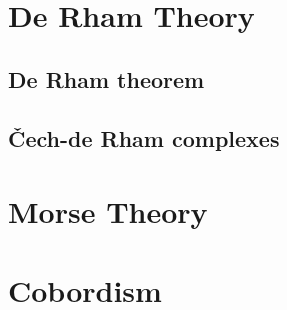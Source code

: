 \documentclass{../note}
\begin{document}
\part{De Rham Theory}
\chapter{De Rham theorem}
\chapter{\v Cech-de Rham complexes}


\part{Morse Theory}

\part{Cobordism}
\end{document}
